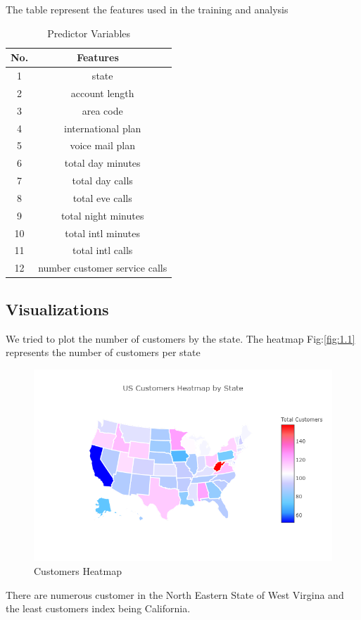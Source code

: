 \documentclass[a4paper,12pt]{report}
\begin{document}
\begin{table}[ht]
The table represent the features used in the training and analysis 
\caption{Predictor Variables } %
\centering %
\begin{tabular}{c c} %
\hline %
 No.  &  Features \ \\ [0.5ex] %
\hline %
1 & state \\ %
2 & account length  \\
3 & area code   \\
4 & international plan  \\
5 & voice mail plan  \\
6 & total day minutes  \\
7 &total day calls  \\
8 & total eve calls  \\
9 &total night minutes \\
10 & total intl minutes  \\
11 & total intl calls  \\
12 & number customer service calls \\ [1ex] %
\hline %
\end{tabular}
\label{table:nonlin} %
\end{table} 
\FloatBarrier
\subsection{Visualizations}
We tried to plot the number of customers by the state. The heatmap Fig:\ref{fig:1.1} represents the number of customers per state
\begin{figure}[h]
\vspace{-4pt}
\center
\includegraphics[scale = 0.5]{customers.png}
\caption{Customers Heatmap}
\label{fig:1.2}
\end{figure}
There are numerous customer in the North Eastern State of West Virgina and the least customers index being California.
\end{document}
